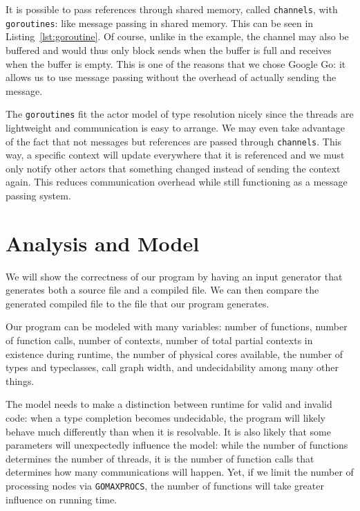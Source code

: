 \documentclass{acm_proc_article-sp}
\begin{document}
It is possible to pass references through shared memory, called
\texttt{channels}, with \texttt{goroutines}: like message passing in shared
memory. This can be seen in Listing~\ref{lst:goroutine}. Of course, unlike in
the example, the channel may also be buffered and would thus only block sends
when the buffer is full and receives when the buffer is empty. This is one of
the reasons that we chose Google Go: it allows us to use message passing
without the overhead of actually sending the message.

The \texttt{goroutines} fit the actor model of type resolution nicely since
the threads are lightweight and communication is easy to arrange. We may even
take advantage of the fact that not messages but references are passed through
\texttt{channels}. This way, a specific context will update everywhere that it
is referenced and we must only notify other actors that something changed
instead of sending the context again. This reduces communication overhead while
still functioning as a message passing system.

\section{Analysis and Model}

We will show the correctness of our program by having an input generator that
generates both a source file and a compiled file. We can then compare the
generated compiled file to the file that our program generates. 

Our program can be modeled with many variables: number of functions, number of
function calls, number of contexts, number of total partial contexts in
existence during runtime, the number of physical cores available, the number of
types and typeclasses, call graph width, and undecidability among many other
things. 

The model needs to make a distinction between runtime for valid and invalid
code: when a type completion becomes undecidable, the program will likely
behave much differently than when it is resolvable. It is also likely that some
parameters will unexpectedly influence the model: while the number of functions
determines the number of threads, it is the number of function calls that
determines how many communications will happen. Yet, if we limit the number of
processing nodes via \texttt{GOMAXPROCS}, the number of functions will take
greater influence on running time.

\end{document}
